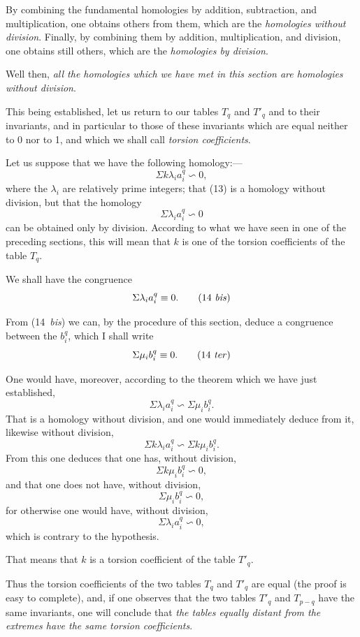 \documentclass{article}
\begin{document}
By combining the fundamental homologies by addition, subtraction, and multiplication, one obtains others from them, which are the \emph{homologies without division}. Finally, by combining them by addition, multiplication, and division, one obtains still others, which are the \emph{homologies by division}.

Well then, \emph{all the homologies which we have met in this section are homologies without division}.

This being established, let us return to our tables $T_{q}$ and $T'_{q}$ and to their invariants, and in particular to those of these invariants which are equal neither to 0 nor to 1, and which we shall call \emph{torsion coefficients}.

Let us suppose that we have the following homology:---
\[ \Sigma k \lambda_{i} a^{q}_{i} \backsim 0, \tag{13} \]
where the $\lambda_{i}$ are relatively prime integers; that (13) is a homology without division, but that the homology
\[ \Sigma \lambda_{i} a^{q}_{i} \backsim 0 \tag{14} \]
can be obtained only by division. According to what we have seen in one of the preceding sections, this will mean that $k$ is one of the torsion coefficients of the table $T_{q}$.

We shall have the congruence
\[ \Sigma \lambda_{i} a^{q}_{i} \equiv 0. \tag{14 \textit{bis}} \]

From (14~\emph{bis}) we can, by the procedure of this section, deduce a congruence between the $b^{q}_{i}$, which I shall write
\[ \Sigma \mu_{i} b^{q}_{i} \equiv 0. \tag{14 \textit{ter}} \]

One would have, moreover, according to the theorem which we have just established,
\[ \Sigma \lambda_{i} a^{q}_{i} \backsim \Sigma \mu_{i} b^{q}_{i}. \]
That is a homology without division, and one would immediately deduce from it, likewise without division,
\[ \Sigma k \lambda_{i} a^{q}_{i} \backsim \Sigma k \mu_{i} b^{q}_{i}. \]
From this one deduces that one has, without division,
\[ \Sigma k \mu_{i} b^{q}_{i} \backsim 0, \]
and that one does not have, without division,
\[ \Sigma \mu_{i} b^{q}_{i} \backsim 0, \]
for otherwise one would have, without division,
\[ \Sigma \lambda_{i} a^{q}_{i} \backsim 0, \]
which is contrary to the hypothesis.

That means that $k$ is a torsion coefficient of the table $T'_{q}$.

Thus the torsion coefficients of the two tables $T_{q}$ and $T'_{q}$ are equal (the proof is easy to complete), and, if one observes that the two tables $T'_{q}$ and $T_{p-q}$ have the same invariants, one will conclude that \emph{the tables equally distant from the extremes have the same torsion coefficients}.
\end{document}
